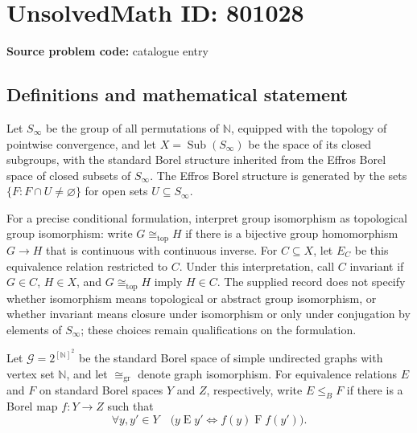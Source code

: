 \documentclass[11pt]{article}
\newcommand{\N}{\mathbb{N}}
\begin{document}
\section*{UnsolvedMath ID: 801028}
\textbf{Source problem code:} catalogue entry
\subsection{Definitions and mathematical statement}
Let $S_\infty$ be the group of all permutations of $\N$, equipped with the topology of pointwise convergence, and let $X=\operatorname{Sub}(S_\infty)$ be the space of its closed subgroups, with the standard Borel structure inherited from the Effros Borel space of closed subsets of $S_\infty$. The Effros Borel structure is generated by the sets $\{F:F\cap U\ne\varnothing\}$ for open sets $U\subseteq S_\infty$.

For a precise conditional formulation, interpret group isomorphism as topological group isomorphism: write $G\cong_{\mathrm{top}}H$ if there is a bijective group homomorphism $G\to H$ that is continuous with continuous inverse. For $C\subseteq X$, let $E_C$ be this equivalence relation restricted to $C$. Under this interpretation, call $C$ invariant if $G\in C$, $H\in X$, and $G\cong_{\mathrm{top}}H$ imply $H\in C$. The supplied record does not specify whether isomorphism means topological or abstract group isomorphism, or whether invariant means closure under isomorphism or only under conjugation by elements of $S_\infty$; these choices remain qualifications on the formulation.

Let $\mathcal G=2^{[\N]^2}$ be the standard Borel space of simple undirected graphs with vertex set $\N$, and let $\cong_{\mathrm{gr}}$ denote graph isomorphism. For equivalence relations $E$ and $F$ on standard Borel spaces $Y$ and $Z$, respectively, write $E\leq_B F$ if there is a Borel map $f:Y\to Z$ such that
\[
\forall y,y'\in Y\quad \bigl(y\mathrel E y'\iff f(y)\mathrel F f(y')\bigr).
\]
\end{document}
